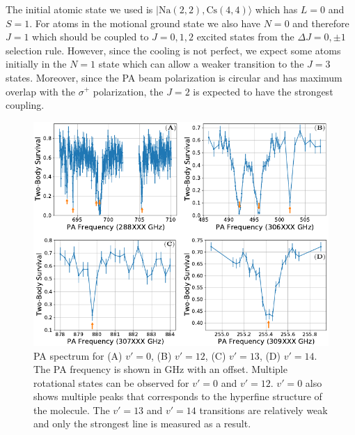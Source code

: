 The initial atomic state we used is $|\mathrm{Na(2, 2),Cs(4, 4)}\rangle$
which has $L=0$ and $S=1$.
For atoms in the motional ground state we also have $N=0$ and therefore $J=1$
which should be coupled to $J=0,1,2$ excited states from the $\Delta J=0,\pm1$ selection rule.
However, since the cooling is not perfect,
we expect some atoms initially in the $N=1$ state which can allow a weaker
transition to the $J=3$ states.
Moreover, since the PA beam polarization is circular
and has maximum overlap with the $\sigma^+$ polarization,
the $J=2$ is expected to have the strongest coupling.

\begin{figure}
  \centering
  \includegraphics[width=\textwidth]{figures/pa_spectrum.pdf}
  \caption[PA spectrum]{
    PA spectrum for (A) $v'=0$, (B) $v'=12$, (C) $v'=13$, (D) $v'=14$.
    The PA frequency is shown in GHz with an offset.
    Multiple rotational states can be observed for $v'=0$ and $v'=12$.
    $v'=0$ also shows multiple peaks that corresponds to
    the hyperfine structure of the molecule.
    The $v'=13$ and $v'=14$ transitions are relatively weak
    and only the strongest line is measured as a result.
    \label{fig:pa:spectrum}}
\end{figure}

